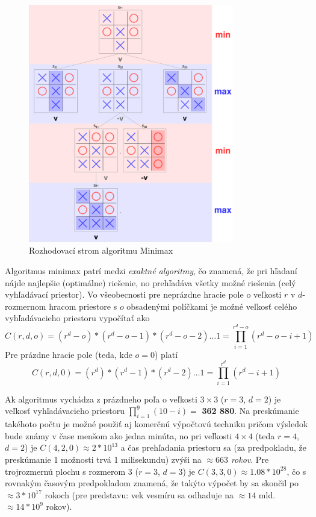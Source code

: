 \begin{figure}[H]
    \centering
    \includegraphics[width=0.8\textwidth]{images/minmax-tree.png}
    \caption{Rozhodovací strom algoritmu Minimax}
\end{figure}\label{figure:minimax-tree}

Algoritmus minimax patrí medzi \emph{exaktné algoritmy}, čo znamená, že pri hľadaní nájde najlepšie (optimálne)
riešenie, no prehľadáva všetky možné riešenia (celý vyhľadávací priestor).
Vo všeobecnosti pre neprázdne hracie pole o veľkosti $r$ v $d$-rozmernom hracom priestore s $o$ obsadenými políčkami je
možné veľkosť celého vyhľadávacieho priestoru vypočítať ako
\begin{equation}
    C(r, d, o) = (r^d - o) * (r^d - o - 1) * (r^d - o - 2) \dots 1 = \prod_{i = 1}^{r^d - o}{(r^d - o - i + 1)}
\end{equation}
Pre prázdne hracie pole (teda, kde $o = 0$) platí
\begin{equation}
    C(r, d, 0) = (r^d) * (r^d - 1) * (r^d - 2) \dots 1 = \prod_{i = 1}^{r^d}{(r^d - i + 1)}
\end{equation}

Ak algoritmus vychádza z prázdneho poľa o veľkosti $3 \times 3$ ($r = 3$, $d = 2$) je veľkosť vyhľadávacieho priestoru
$\prod_{i = 1}^{9}{(10 - i)} =$ \textbf{362 880}.
Na preskúmanie takéhoto počtu je možné použiť aj komerčnú výpočtovú techniku pričom výsledok bude známy v čase menšom
ako jedna minúta, no pri veľkosti $4 \times 4$ (teda $r = 4$, $d = 2$) je $C(4, 2, 0) \approx 2*10^{13}$ a čas
prehľadania priestoru sa (za predpokladu, že preskúmanie 1 možnosti trvá 1 milisekundu) zvýši na
\emph{$\approx 663$ rokov}.
Pre trojrozmernú plochu s rozmerom $3$ ($r = 3$, $d = 3$) je $C(3, 3, 0) \approx 1.08 * 10^{28}$, čo s rovnakým časovým
predpokladom znamená, že takýto výpočet by sa skončil po $\approx 3*10^{17}$ rokoch (pre predstavu: vek vesmíru sa
odhaduje na $\approx 14$ mld. $\approx 14 * 10^9$ rokov).

